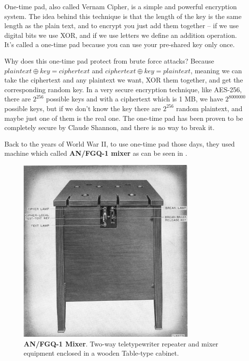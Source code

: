 One-time pad, also called Vernam Cipher, is a simple and powerful encryption system. The idea behind this technique is that the length of the key is the same length as the plain text, and to encrypt you just add them together – if we use digital bits we use XOR, and if we use letters we define an addition operation. It’s called a one-time pad because you can use your pre-shared key only once.

Why does this one-time pad protect from brute force attacks? Because $plaintext \oplus key = ciphertext$ and $ciphertext \oplus key = plaintext$, meaning we can take the ciphertext and any plaintext we want, XOR them together, and get the corresponding random key. In a very secure encryption technique, like AES-256, there are \(2^{256}\) possible keys and with a ciphertext which is 1 MB, we have \(2^{8000000}\) possible keys, but if we don’t know the key there are \(2^{256}\) random plaintext, and maybe just one of them is the real one. The one-time pad has been proven to be completely secure by Claude Shannon, and there is no way to break it.

Back to the years of World War II, to use one-time pad those days, they used machine which called \textbf{AN/FGQ-1 mixer}\cite{cryptoMix} as can be seen in .

\begin{figure}[htb]
    \centering
    \includegraphics[width=0.8\textwidth]{images/ch1_Intro/MIxer.jpg}
    \caption{\textbf{AN/FGQ-1 Mixer}. Two-way teletypewriter repeater and mixer equipment enclosed in a wooden Table-type cabinet.}
    \label{fig:Mixer}
\end{figure}

